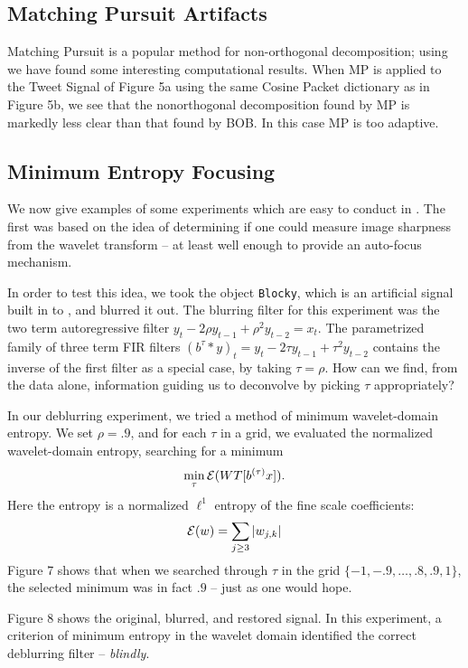 \subsection{Matching Pursuit Artifacts}

Matching Pursuit \cite{MZ} is a popular method for non-orthogonal decomposition;
using \WaveLab we have found some interesting computational
results.  When MP is applied to the Tweet Signal
of Figure 5a using the same Cosine Packet dictionary as in Figure 5b,
we see that the nonorthogonal decomposition found
by MP is markedly less clear than that found by BOB.
In this case MP is too adaptive.
 
\subsection{Minimum Entropy Focusing}

We now give examples of some experiments which are easy to conduct in \WaveLab.
The first was based on the idea of determining if one could measure
image sharpness from the wavelet transform -- at least well
enough to provide an auto-focus mechanism.

In order to test this idea, we took the object {\tt Blocky},
which is an artificial signal built in to \WaveLab, and blurred it
out.  The blurring filter for this experiment
was the two term autoregressive filter
$y_t -2 \rho y_{t-1} +  \rho^2  y_{t-2}  = x_t  $.  The parametrized family of 
three term FIR filters $(b^\tau * y )_t = y_t  -2 \tau y_{t-1} +  \tau^2  y_{t-2}$ 
contains the
inverse of the first filter as a special case, by taking $\tau = \rho$.
How can we find, from the data alone, information guiding us
to deconvolve by picking $\tau$ appropriately?

In our deblurring experiment, we tried
a method of minimum wavelet-domain entropy.
We set $\rho= .9$, and for each
$\tau$ in a grid, we evaluated the normalized 
wavelet-domain entropy, searching for a minimum
\[
     \min_\tau {\cal E} ( WT[b^{(\tau)} x] ) .
\]
Here the entropy is a normalized $\ell^1$ entropy
of the fine scale coefficients:
\[
     {\cal E} (w) =  \sum_{j \geq 3} |w_{j,k}|
\]
Figure 7 shows that when we searched through $\tau$ in the grid
$\{ -1, -.9, \dots , .8, .9, 1\}$,
the selected minimum was in fact $.9$ -- just as one would hope.

Figure 8 shows the original, blurred, and restored signal.
In this experiment, a criterion of minimum entropy in the wavelet
domain identified the correct deblurring filter -- {\it blindly}.


